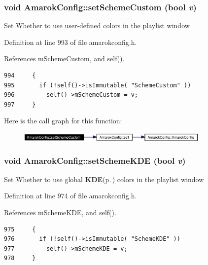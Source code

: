 \subsubsection{\setlength{\rightskip}{0pt plus 5cm}void Amarok\-Config::set\-Scheme\-Custom (bool {\em v})\hspace{0.3cm}{\tt  [inline, static]}}\label{classAmarokConfig_AmarokConfige103}


Set Whether to use user-defined colors in the playlist window 

Definition at line 993 of file amarokconfig.h.

References m\-Scheme\-Custom, and self().



\footnotesize\begin{verbatim}994     {
995       if (!self()->isImmutable( "SchemeCustom" ))
996         self()->mSchemeCustom = v;
997     }
\end{verbatim}\normalsize 


Here is the call graph for this function:\begin{figure}[H]
\begin{center}
\leavevmode
\includegraphics[width=266pt]{classAmarokConfig_AmarokConfige103_cgraph}
\end{center}
\end{figure}
\subsubsection{\setlength{\rightskip}{0pt plus 5cm}void Amarok\-Config::set\-Scheme\-KDE (bool {\em v})\hspace{0.3cm}{\tt  [inline, static]}}\label{classAmarokConfig_AmarokConfige101}


Set Whether to use global {\bf KDE}{\rm (p.\,\pageref{namespaceKDE})} colors in the playlist window 

Definition at line 974 of file amarokconfig.h.

References m\-Scheme\-KDE, and self().



\footnotesize\begin{verbatim}975     {
976       if (!self()->isImmutable( "SchemeKDE" ))
977         self()->mSchemeKDE = v;
978     }
\end{verbatim}\normalsize 


